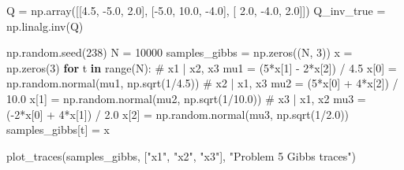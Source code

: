 \documentclass[
  letterpaper,
  DIV=11,
  numbers=noendperiod]{scrartcl}
\newenvironment{Shaded}{\begin{snugshade}}{\end{snugshade}}
\newcommand{\BuiltInTok}[1]{\textcolor[rgb]{0.00,0.23,0.31}{#1}}
\newcommand{\CommentTok}[1]{\textcolor[rgb]{0.37,0.37,0.37}{#1}}
\newcommand{\ControlFlowTok}[1]{\textcolor[rgb]{0.00,0.23,0.31}{\textbf{#1}}}
\newcommand{\DecValTok}[1]{\textcolor[rgb]{0.68,0.00,0.00}{#1}}
\newcommand{\FloatTok}[1]{\textcolor[rgb]{0.68,0.00,0.00}{#1}}
\newcommand{\KeywordTok}[1]{\textcolor[rgb]{0.00,0.23,0.31}{\textbf{#1}}}
\newcommand{\NormalTok}[1]{\textcolor[rgb]{0.00,0.23,0.31}{#1}}
\newcommand{\OperatorTok}[1]{\textcolor[rgb]{0.37,0.37,0.37}{#1}}
\newcommand{\StringTok}[1]{\textcolor[rgb]{0.13,0.47,0.30}{#1}}
\begin{document}
\begin{Shaded}
\begin{Highlighting}[]
\NormalTok{Q }\OperatorTok{=}\NormalTok{ np.array([[}\FloatTok{4.5}\NormalTok{, }\OperatorTok{{-}}\FloatTok{5.0}\NormalTok{,  }\FloatTok{2.0}\NormalTok{],}
\NormalTok{              [}\OperatorTok{{-}}\FloatTok{5.0}\NormalTok{, }\FloatTok{10.0}\NormalTok{, }\OperatorTok{{-}}\FloatTok{4.0}\NormalTok{],}
\NormalTok{              [ }\FloatTok{2.0}\NormalTok{, }\OperatorTok{{-}}\FloatTok{4.0}\NormalTok{,  }\FloatTok{2.0}\NormalTok{]])}
\NormalTok{Q\_inv\_true }\OperatorTok{=}\NormalTok{ np.linalg.inv(Q)}

\NormalTok{np.random.seed(}\DecValTok{238}\NormalTok{)}
\NormalTok{N }\OperatorTok{=} \DecValTok{10000}
\NormalTok{samples\_gibbs }\OperatorTok{=}\NormalTok{ np.zeros((N, }\DecValTok{3}\NormalTok{))}
\NormalTok{x }\OperatorTok{=}\NormalTok{ np.zeros(}\DecValTok{3}\NormalTok{)}
\ControlFlowTok{for}\NormalTok{ t }\KeywordTok{in} \BuiltInTok{range}\NormalTok{(N):}
    \CommentTok{\# x1 | x2, x3}
\NormalTok{    mu1 }\OperatorTok{=}\NormalTok{ (}\DecValTok{5}\OperatorTok{*}\NormalTok{x[}\DecValTok{1}\NormalTok{] }\OperatorTok{{-}} \DecValTok{2}\OperatorTok{*}\NormalTok{x[}\DecValTok{2}\NormalTok{]) }\OperatorTok{/} \FloatTok{4.5}
\NormalTok{    x[}\DecValTok{0}\NormalTok{] }\OperatorTok{=}\NormalTok{ np.random.normal(mu1, np.sqrt(}\DecValTok{1}\OperatorTok{/}\FloatTok{4.5}\NormalTok{))}
    \CommentTok{\# x2 | x1, x3}
\NormalTok{    mu2 }\OperatorTok{=}\NormalTok{ (}\DecValTok{5}\OperatorTok{*}\NormalTok{x[}\DecValTok{0}\NormalTok{] }\OperatorTok{+} \DecValTok{4}\OperatorTok{*}\NormalTok{x[}\DecValTok{2}\NormalTok{]) }\OperatorTok{/} \FloatTok{10.0}
\NormalTok{    x[}\DecValTok{1}\NormalTok{] }\OperatorTok{=}\NormalTok{ np.random.normal(mu2, np.sqrt(}\DecValTok{1}\OperatorTok{/}\FloatTok{10.0}\NormalTok{))}
    \CommentTok{\# x3 | x1, x2}
\NormalTok{    mu3 }\OperatorTok{=}\NormalTok{ (}\OperatorTok{{-}}\DecValTok{2}\OperatorTok{*}\NormalTok{x[}\DecValTok{0}\NormalTok{] }\OperatorTok{+} \DecValTok{4}\OperatorTok{*}\NormalTok{x[}\DecValTok{1}\NormalTok{]) }\OperatorTok{/} \FloatTok{2.0}
\NormalTok{    x[}\DecValTok{2}\NormalTok{] }\OperatorTok{=}\NormalTok{ np.random.normal(mu3, np.sqrt(}\DecValTok{1}\OperatorTok{/}\FloatTok{2.0}\NormalTok{))}
\NormalTok{    samples\_gibbs[t] }\OperatorTok{=}\NormalTok{ x}

\NormalTok{plot\_traces(samples\_gibbs, [}\StringTok{"x1"}\NormalTok{, }\StringTok{"x2"}\NormalTok{, }\StringTok{"x3"}\NormalTok{], }\StringTok{"Problem 5 Gibbs traces"}\NormalTok{)}


\end{Highlighting}
\end{Shaded}
\end{document}
